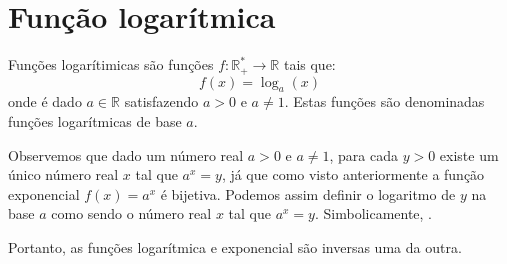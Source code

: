 \section{Função logarítmica}

\begin{obs}
 Funções logarítimicas são funções $f: \mathbb{R_{+}^{*}} \rightarrow \mathbb{R} $ tais que:
\begin{equation*}
f(x) = \log_{a}(x)
\end{equation*}
 onde é dado $a \in \mathbb{R}$ satisfazendo $a>0$ e $a \neq 1$. Estas funções são denominadas funções logarítmicas de base $a$.
\end{obs}


 Observemos que dado um número real $a> 0$ e $a \neq 1$, para cada $y>0$ existe um único número real $x$ tal que $a^x= y$, já que como visto anteriormente a função exponencial $f(x)= a^x$ é bijetiva. Podemos assim definir o logaritmo de $y$ na base $a$ como sendo o número real $x$ tal que $a^x= y$. Simbolicamente,
 .

 Portanto, as funções logarítmica e exponencial são inversas uma da outra.

